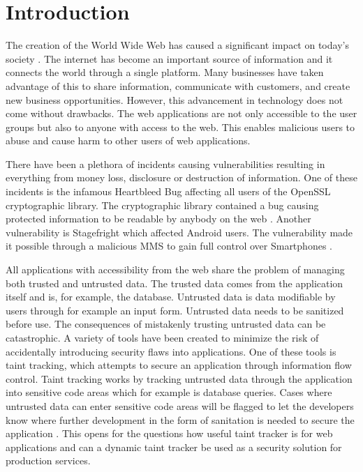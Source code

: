 \chapter{Introduction}
\label{Introduction}
The creation of the World Wide Web has caused a significant impact on today's society \parencite{www}. The internet has become an important source of information and it connects the world through a single platform. Many businesses have taken advantage of this to share information, communicate with customers, and create new business opportunities. However, this advancement in technology does not come without drawbacks. The web applications are not only accessible to the user groups but also to anyone with access to the web. This enables malicious users to abuse and cause harm to other users of web applications. 

There have been a plethora of incidents causing vulnerabilities resulting in everything from money loss, disclosure or destruction of information. One of these incidents is the infamous Heartbleed Bug affecting all users of the OpenSSL cryptographic library. The cryptographic library contained a bug causing protected information to be readable by anybody on the web \parencite{Heartbleed}. Another vulnerability is Stagefright which affected Android users. The vulnerability made it possible through a malicious MMS to gain full control over Smartphones \parencite{2015ASvt}. 

All applications with accessibility from the web share the problem of managing both trusted and untrusted data. The trusted data comes from the application itself and is, for example, the database. Untrusted data is data modifiable by users through for example an input form. Untrusted data needs to be sanitized before use. The consequences of mistakenly trusting untrusted data can be catastrophic. A variety of tools have been created to minimize the risk of accidentally introducing security flaws into applications. One of these tools is taint tracking, which attempts to secure an application through information flow control. Taint tracking works by tracking untrusted data through the application into sensitive code areas which for example is database queries. Cases where untrusted data can enter sensitive code areas will be flagged to let the developers know where further development in the form of sanitation is needed to secure the application \parencite{Pan2015, Venkataramani2008}. This opens for the questions how useful taint tracker is for web applications and can a dynamic taint tracker be used as a security solution for production services.



